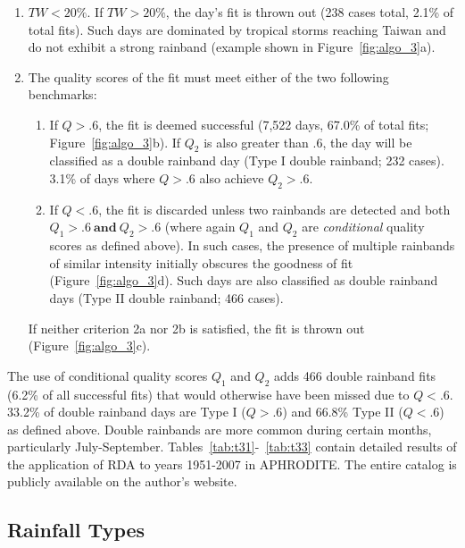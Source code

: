 \documentclass[9pt,twocolumn,twoside,lineno]{pnas-new}
\begin{document}
\begin{enumerate}

	\item $TW < 20\%$. If $TW > 20\%$, the day's fit is thrown out (238 cases total, 2.1\% of total fits). Such days are dominated by tropical storms reaching Taiwan and do not exhibit a strong rainband (example shown in Figure~\ref{fig:algo_3}a).  
	
	\item The quality scores of the fit must meet either of the two following benchmarks:
	
	\begin{enumerate} 
	
	\item If $Q>.6$, the fit is deemed successful (7,522 days, 67.0\% of total fits; Figure~\ref{fig:algo_3}b). If $Q_2$ is also greater than .6, the day will be classified as a double rainband day (Type I double rainband; 232 cases). 3.1\% of days where $Q>.6$ also achieve $Q_2>.6$.
		
	\item If $Q<.6$, the fit is discarded unless two rainbands are detected and both $Q_1 > .6\mathrm{\ \textbf{and}\ }Q_2 > .6$ (where again $Q_1$ and $Q_2$ are \textit{conditional} quality scores as defined above). In such cases, the presence of multiple rainbands of similar intensity initially obscures the goodness of fit (Figure~\ref{fig:algo_3}d). Such days are also classified as double rainband days (Type II double rainband; 466 cases).
	
	\end{enumerate}
	
	If neither criterion 2a nor 2b is satisfied, the fit is thrown out (Figure~\ref{fig:algo_3}c).
	
\end{enumerate}	

	The use of conditional quality scores $Q_1$ and $Q_2$ adds 466 double rainband fits (6.2\% of all successful fits) that would otherwise have been missed due to $Q<.6$. 33.2\% of double rainband days are Type I ($Q>.6$) and 66.8\% Type II ($Q<.6$) as defined above. Double rainbands are more common during certain months, particularly July-September. Tables~\ref{tab:t31}-~\ref{tab:t33} contain detailed results of the application of RDA to years 1951-2007 in APHRODITE. The entire catalog is publicly available on the author's website.

\subsection*{Rainfall Types}
	
\end{document}
